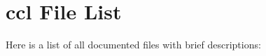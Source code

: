 \section{ccl File List}
Here is a list of all documented files with brief descriptions:\begin{CompactList}
\item{}
\end{CompactList}
